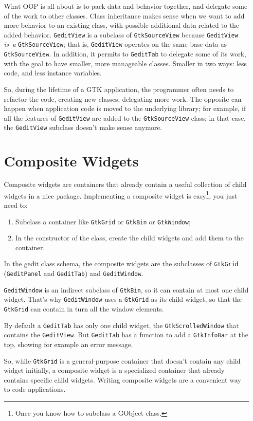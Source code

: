What OOP is all about is to pack data and behavior together, and delegate some of the work to other classes. Class inheritance makes sense when we want to add more behavior to an existing class, with possible additional data related to the added behavior. \lstinline{GeditView} is a subclass of \lstinline{GtkSourceView} because \lstinline{GeditView} \emph{is~a} \lstinline{GtkSourceView}; that is, \lstinline{GeditView} operates on the same base data as \lstinline{GtkSourceView}. In addition, it permits to \lstinline{GeditTab} to delegate some of its work, with the goal to have smaller, more manageable classes. Smaller in two ways: less code, and less instance variables.

So, during the lifetime of a GTK application, the programmer often needs to refactor the code, creating new classes, delegating more work. The opposite can happen when application code is moved to the underlying library; for example, if all the features of \lstinline{GeditView} are added to the \lstinline{GtkSourceView} class; in that case, the \lstinline{GeditView} subclass doesn't make sense anymore.

\section{Composite Widgets}

Composite widgets are containers that already contain a useful collection of child widgets in a nice package. Implementing a composite widget is easy\footnote{Once you know how to subclass a GObject class.}, you just need to:
\begin{enumerate}
  \item Subclass a container like \lstinline{GtkGrid} or \lstinline{GtkBin} or \lstinline{GtkWindow};
  \item In the constructor of the class, create the child widgets and add them to the container.
\end{enumerate}

In the gedit class schema, the composite widgets are the subclasses of \lstinline{GtkGrid} (\lstinline{GeditPanel} and \lstinline{GeditTab}) and \lstinline{GeditWindow}.

\lstinline{GeditWindow} is an indirect subclass of \lstinline{GtkBin}, so it can contain at most one child widget. That's why \lstinline{GeditWindow} uses a \lstinline{GtkGrid} as its child widget, so that the \lstinline{GtkGrid} can contain in turn all the window elements.

By default a \lstinline{GeditTab} has only one child widget, the \lstinline{GtkScrolledWindow} that contains the \lstinline{GeditView}. But \lstinline{GeditTab} has a function to add a \lstinline{GtkInfoBar} at the top, showing for example an error message.

So, while \lstinline{GtkGrid} is a general-purpose container that doesn't contain any child widget initially, a composite widget is a specialized container that already contains specific child widgets. Writing composite widgets are a convenient way to code applications.

